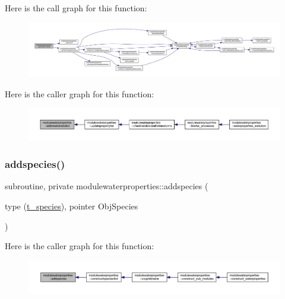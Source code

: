 Here is the call graph for this function\+:\nopagebreak
\begin{figure}[H]
\begin{center}
\leavevmode
\includegraphics[width=350pt]{namespacemodulewaterproperties_a201bc7106a0e1c889114fc878140e91f_cgraph}
\end{center}
\end{figure}
Here is the caller graph for this function\+:\nopagebreak
\begin{figure}[H]
\begin{center}
\leavevmode
\includegraphics[width=350pt]{namespacemodulewaterproperties_a201bc7106a0e1c889114fc878140e91f_icgraph}
\end{center}
\end{figure}
\mbox{\label{namespacemodulewaterproperties_a3a5d5bfc3fea263034ab4c86a339e9f5}} 
\subsubsection{\texorpdfstring{addspecies()}{addspecies()}}
{\footnotesize\ttfamily subroutine, private modulewaterproperties\+::addspecies (\begin{DoxyParamCaption}\item[{type (\mbox{\hyperlink{structmodulewaterproperties_1_1t__species}{t\+\_\+species}}), pointer}]{Obj\+Species }\end{DoxyParamCaption})\hspace{0.3cm}{\ttfamily [private]}}

Here is the caller graph for this function\+:\nopagebreak
\begin{figure}[H]
\begin{center}
\leavevmode
\includegraphics[width=350pt]{namespacemodulewaterproperties_a3a5d5bfc3fea263034ab4c86a339e9f5_icgraph}
\end{center}
\end{figure}
\mbox{\label{namespacemodulewaterproperties_a2450d655461a0013ffb3d932848b59b7}} 
